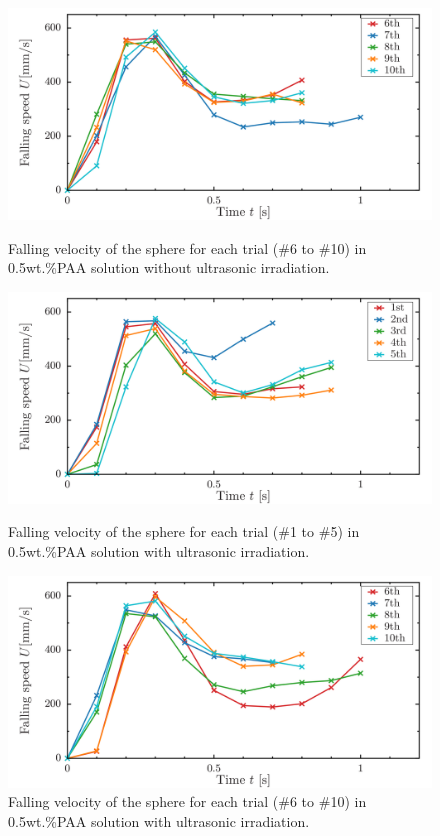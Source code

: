 \begin{figure}[ht]
    \centering
    \includegraphics[width=12cm,clip]{4-Results/s0.5-0-6-10.png}
    \caption{Falling velocity of the sphere for each trial (\#6 to \#10) in 0.5wt.\%PAA solution without ultrasonic irradiation.}
    \label{fig:0.5PAA-falling6-10}
    \centering
    \includegraphics[width=12cm,clip]{4-Results/s0.5-39-1-5.png}
    \caption{Falling velocity of the sphere for each trial (\#1 to \#5) in 0.5wt.\%PAA solution with ultrasonic irradiation.}
    \label{fig:0.5onPAA-falling1-5}
    \centering
    \includegraphics[width=12cm,clip]{4-Results/s0.5-39-6-10.png}
    \caption{Falling velocity of the sphere for each trial (\#6 to \#10) in 0.5wt.\%PAA solution with ultrasonic irradiation.}
    \label{fig:0.5onPAA-falling6-10}
\end{figure}

